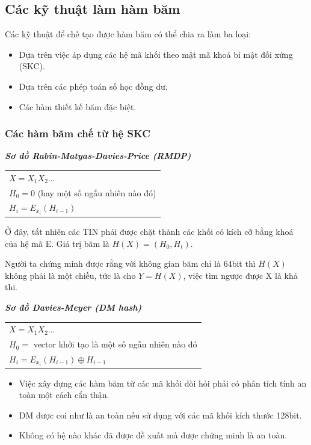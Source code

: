 \documentclass[a4paper,12pt]{report}
\begin{document}
\subsection*{Các kỹ thuật làm hàm băm}
Các kỹ thuật để chế tạo được hàm băm có thể chia ra làm ba loại:
\begin{itemize}
\item Dựa trên việc áp dụng các hệ mã khối theo mật mã khoá bí mật đối xứng (SKC).
\item Dựa trên các phép toán số học đồng dư.
\item Các hàm thiết kế băm đặc biệt.
\end{itemize}
\subsubsection{Các hàm băm chế từ hệ SKC}
\textbf{\textit{Sơ đồ Rabin-Matyas-Davies-Price (RMDP)}}
\begin{center}
\begin{tabular}{l}
$X = X_1 X_2 \ldots$ \\
$H_0 = 0$ (hay một số ngẫu nhiên nào đó) \\
$H_i = E_{x_i}(H_{i - 1})$ \\
\end{tabular}
\end{center}

Ở đây, tất nhiên các TIN phải được chặt thành các khối có kích cỡ bằng khoá của hệ mã E. Giá trị băm là $H(X) = (H_0,H_t)$.

Người ta chứng minh được rằng với không gian băm chỉ là 64bit thì $H(X)$ không phải là một chiều, tức là cho $Y=H(X)$, việc tìm ngược được X là khả thi.

\textbf{\textit{Sơ đồ Davies-Meyer (DM hash)}}
\begin{center}
\begin{tabular}{l}
$X = X_1 X_2 \ldots$ \\
$H_0 = $ vector khởi tạo là một số ngẫu nhiên nào đó \\
$H_i = E_{x_i}(H_{i-1}) \oplus H_{i-1}$	 \\
\end{tabular}
\end{center}
\begin{itemize}
\item Việc xây dựng các hàm băm từ các mã khối đòi hỏi phải có phân tích tính an toàn một cách cẩn thận.
\item DM được coi như là an toàn nếu sử dụng với các mã khối kích thước 128bit.
\item Không có hệ nào khác đã được đề xuất mà được chứng minh là an toàn.
\end{itemize}
\end{document}
